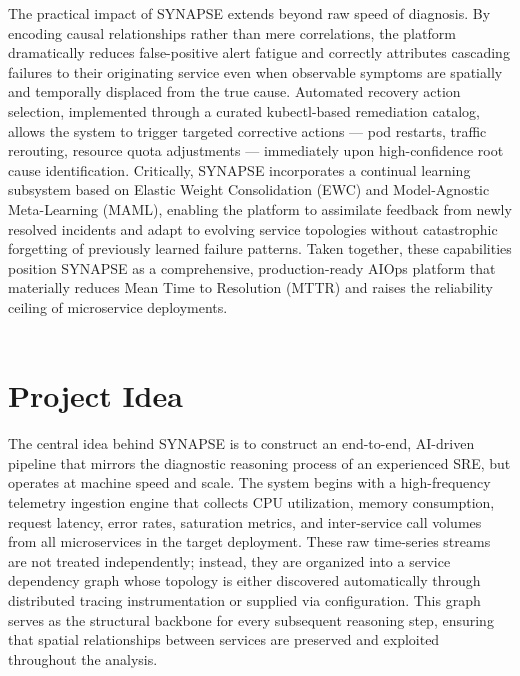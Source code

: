 \hspace*{0.3in} The practical impact of SYNAPSE extends beyond raw speed of diagnosis. By encoding causal relationships rather than mere correlations, the platform dramatically reduces false-positive alert fatigue and correctly attributes cascading failures to their originating service even when observable symptoms are spatially and temporally displaced from the true cause. Automated recovery action selection, implemented through a curated kubectl-based remediation catalog, allows the system to trigger targeted corrective actions — pod restarts, traffic rerouting, resource quota adjustments — immediately upon high-confidence root cause identification. Critically, SYNAPSE incorporates a continual learning subsystem based on Elastic Weight Consolidation (EWC) and Model-Agnostic Meta-Learning (MAML), enabling the platform to assimilate feedback from newly resolved incidents and adapt to evolving service topologies without catastrophic forgetting of previously learned failure patterns. Taken together, these capabilities position SYNAPSE as a comprehensive, production-ready AIOps platform that materially reduces Mean Time to Resolution (MTTR) and raises the reliability ceiling of microservice deployments.\\\\

\section{Project Idea}

\hspace*{0.3in} The central idea behind SYNAPSE is to construct an end-to-end, AI-driven pipeline that mirrors the diagnostic reasoning process of an experienced SRE, but operates at machine speed and scale. The system begins with a high-frequency telemetry ingestion engine that collects CPU utilization, memory consumption, request latency, error rates, saturation metrics, and inter-service call volumes from all microservices in the target deployment. These raw time-series streams are not treated independently; instead, they are organized into a service dependency graph whose topology is either discovered automatically through distributed tracing instrumentation or supplied via configuration. This graph serves as the structural backbone for every subsequent reasoning step, ensuring that spatial relationships between services are preserved and exploited throughout the analysis.\\\\

